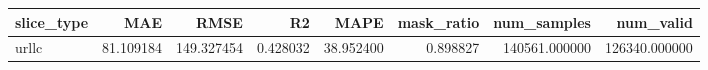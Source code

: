 \begin{tabular}{lrrrrrrr}
\toprule
slice_type & MAE & RMSE & R2 & MAPE & mask_ratio & num_samples & num_valid \\
\midrule
urllc & 81.109184 & 149.327454 & 0.428032 & 38.952400 & 0.898827 & 140561.000000 & 126340.000000 \\
\bottomrule
\end{tabular}
